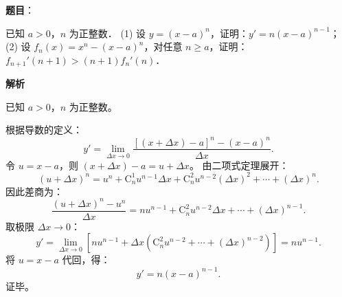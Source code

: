 \begin{answer}

\textbf{题目}：

已知 $a > 0$，$n$ 为正整数．
(1) 设 $y = (x - a)^n$，证明：$y' = n(x - a)^{n-1}$；
(2) 设 $f_n(x) = x^n - (x - a)^n$，对任意 $n \ge a$，证明：$f_{n+1}'(n+1) > (n+1)f_n'(n)$．

\textbf{解析}

已知 $a > 0$，$n$ 为正整数。


根据导数的定义：
\nopagebreak[4]
\[y' = \lim_{\Delta x \to 0} \frac{[(x + \Delta x) - a]^n - (x - a)^n}{\Delta x}.\]
令 $u = x - a$，则 $(x + \Delta x) - a = u + \Delta x$。
由二项式定理展开：
\nopagebreak[4]
\[(u + \Delta x)^n = u^n + \mathrm{C}_n^1 u^{n-1} \Delta x + \mathrm{C}_n^2 u^{n-2} (\Delta x)^2 + \cdots + (\Delta x)^n.\]
因此差商为：
\nopagebreak[4]
\[\frac{(u + \Delta x)^n - u^n}{\Delta x} = n u^{n-1} + \mathrm{C}_n^2 u^{n-2} \Delta x + \cdots + (\Delta x)^{n-1}.\]
取极限 $\Delta x \to 0$：
\nopagebreak[4]
\[y' = \lim_{\Delta x \to 0} \left[ n u^{n-1} + \Delta x \left(\mathrm{C}_n^2 u^{n-2} + \cdots + (\Delta x)^{n-2}\right) \right] = n u^{n-1}.\]
将 $u = x - a$ 代回，得：
\nopagebreak[4]
\[y' = n(x - a)^{n-1}.\]
证毕。



\end{answer}
